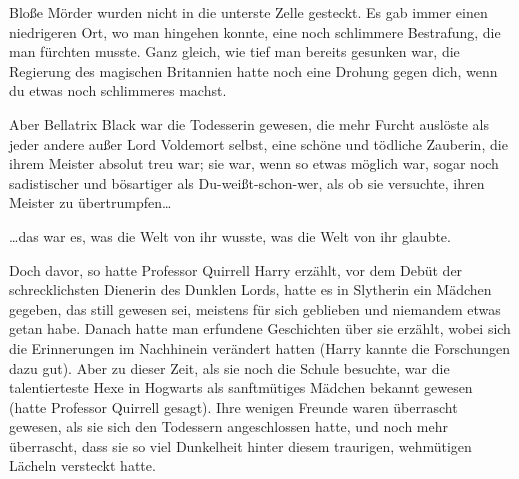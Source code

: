 Bloße Mörder wurden nicht in die unterste Zelle gesteckt. Es gab immer einen niedrigeren Ort, wo man hingehen konnte, eine noch schlimmere Bestrafung, die man fürchten musste. Ganz gleich, wie tief man bereits gesunken war, die Regierung des magischen Britannien hatte noch eine Drohung gegen dich, wenn du etwas noch schlimmeres machst.

Aber Bellatrix Black war die Todesserin gewesen, die mehr Furcht auslöste als jeder andere außer Lord Voldemort selbst, eine schöne und tödliche Zauberin, die ihrem Meister absolut treu war; sie war, wenn so etwas möglich war, sogar noch sadistischer und bösartiger als Du-weißt-schon-wer, als ob sie versuchte, ihren Meister zu übertrumpfen…

…das war es, was die Welt von ihr wusste, was die Welt von ihr glaubte.

Doch davor, so hatte Professor Quirrell Harry erzählt, vor dem Debüt der schrecklichsten Dienerin des Dunklen Lords, hatte es in Slytherin ein Mädchen gegeben, das still gewesen sei, meistens für sich geblieben und niemandem etwas getan habe. Danach hatte man erfundene Geschichten über sie erzählt, wobei sich die Erinnerungen im Nachhinein verändert hatten (Harry kannte die Forschungen dazu gut). Aber zu dieser Zeit, als sie noch die Schule besuchte, war die talentierteste Hexe in Hogwarts als sanftmütiges Mädchen bekannt gewesen (hatte Professor Quirrell gesagt). Ihre wenigen Freunde waren überrascht gewesen, als sie sich den Todessern angeschlossen hatte, und noch mehr überrascht, dass sie so viel Dunkelheit hinter diesem traurigen, wehmütigen Lächeln versteckt hatte.


